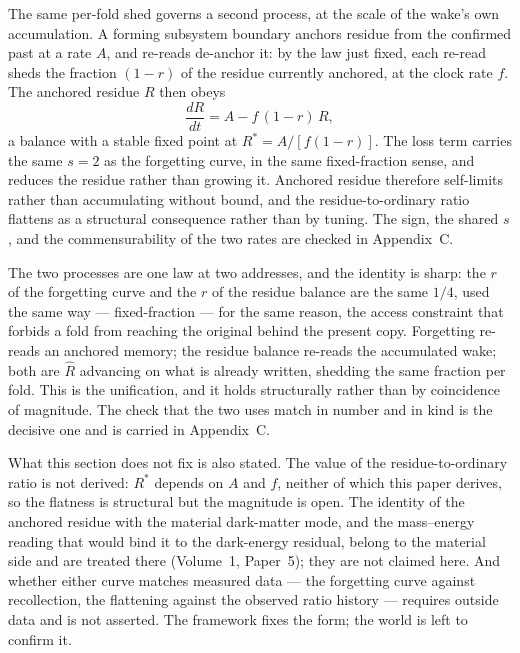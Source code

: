 \documentclass[11pt,oneside]{report}
\theoremstyle{definition}
\theoremstyle{remark}
\begin{document}
The same per-fold shed governs a second process, at the scale of the
wake's own accumulation. A forming subsystem boundary anchors residue from
the confirmed past at a rate \ensuremath{A}, and re-reads de-anchor it: by
the law just fixed, each re-read sheds the fraction
\ensuremath{(1-r)} of the residue currently anchored, at the clock rate
\ensuremath{f}. The anchored residue \ensuremath{R} then obeys
\begin{equation*}
\frac{dR}{dt} = A - f\,(1-r)\,R,
\end{equation*}
a balance with a stable fixed point at \ensuremath{R^{*} = A / [f(1-r)]}.
The loss term carries the same \ensuremath{s = 2} as the forgetting curve,
in the same fixed-fraction sense, and reduces the residue rather than
growing it. Anchored residue therefore self-limits rather than
accumulating without bound, and the residue-to-ordinary ratio flattens as
a structural consequence rather than by tuning. The sign, the shared
\ensuremath{s}, and the commensurability of the two rates are checked in
Appendix~C.

The two processes are one law at two addresses, and the identity is sharp:
the \ensuremath{r} of the forgetting curve and the \ensuremath{r} of the
residue balance are the same \ensuremath{1/4}, used the same way ---
fixed-fraction --- for the same reason, the access constraint that forbids
a fold from reaching the original behind the present copy. Forgetting
re-reads an anchored memory; the residue balance re-reads the accumulated
wake; both are \ensuremath{\hat{R}} advancing on what is already written,
shedding the same fraction per fold. This is the unification, and it holds
structurally rather than by coincidence of magnitude. The check that the
two uses match in number and in kind is the decisive one and is carried in
Appendix~C.

What this section does not fix is also stated. The value of the
residue-to-ordinary ratio is not derived: \ensuremath{R^{*}} depends on
\ensuremath{A} and \ensuremath{f}, neither of which this paper derives, so
the flatness is structural but the magnitude is open. The identity of the
anchored residue with the material dark-matter mode, and the mass--energy
reading that would bind it to the dark-energy residual, belong to the
material side and are treated there (Volume~1, Paper~5); they are not
claimed here. And whether either curve matches measured data --- the
forgetting curve against recollection, the flattening against the observed
ratio history --- requires outside data and is not asserted. The framework
fixes the form; the world is left to confirm it.
\end{document}
